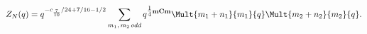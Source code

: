 \begin{equation}
Z_N(q) = q^{-c_{\frac{7}{10}}/24+7/16-1/2}
\sum_{
m_1,\,m_2\,odd}
q^{\tfrac{1}{4}\bf{m}C\bf{m}}
\Mult{m_1+n_1}{m_1}{q}\Mult{m_2+n_2}{m_2}{q}.
\end{equation}

